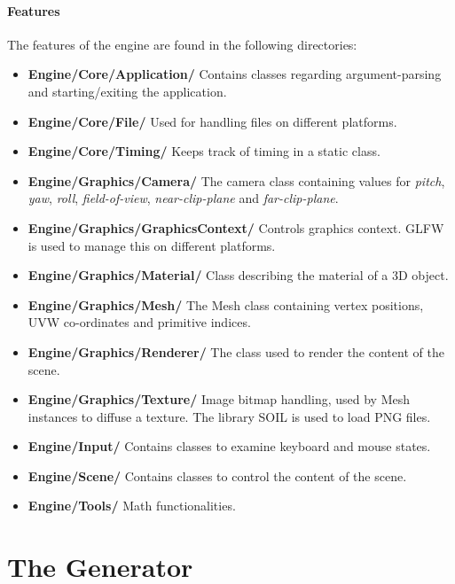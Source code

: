 \paragraph{Features}
The features of the engine are found in the following directories:
\begin{itemize}
\item {\bf Engine/Core/Application/} Contains classes regarding argument-parsing and starting/exiting the application.
\item {\bf Engine/Core/File/} Used for handling files on different platforms.
\item {\bf Engine/Core/Timing/} Keeps track of timing in a static class.
\item {\bf Engine/Graphics/Camera/} The camera class containing values for {\em pitch}, {\em yaw}, {\em roll}, {\em field-of-view}, {\em near-clip-plane} and {\em far-clip-plane}.
\item {\bf Engine/Graphics/GraphicsContext/} Controls graphics context. GLFW is used to manage this on different platforms.
\item {\bf Engine/Graphics/Material/} Class describing the material of a 3D object.
\item {\bf Engine/Graphics/Mesh/} The Mesh class containing vertex positions, UVW co-ordinates and primitive indices.
\item {\bf Engine/Graphics/Renderer/} The class used to render the content of the scene.
\item {\bf Engine/Graphics/Texture/} Image bitmap handling, used by Mesh instances to diffuse a texture. The library SOIL is used to load PNG files.
\item {\bf Engine/Input/} Contains classes to examine keyboard and mouse states.
\item {\bf Engine/Scene/} Contains classes to control the content of the scene.
\item {\bf Engine/Tools/} Math functionalities.
\end{itemize}

\section{The Generator}


